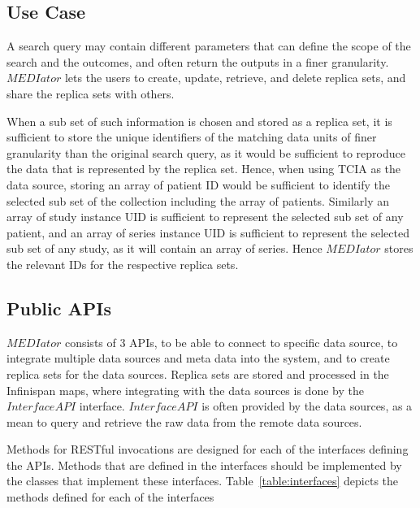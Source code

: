 \documentclass[conference]{IEEEtran}
\begin{document}
\subsection{Use Case}
A search query may contain different parameters that can define the scope of the search and the outcomes, and often return the outputs in a finer granularity. $MEDIator$ lets the users to create, update, retrieve, and delete replica sets, and share the replica sets with others.

When a sub set of such information is chosen and stored as a replica set, it is sufficient to store the unique identifiers of the matching data units of finer granularity than the original search query, as it would be sufficient to reproduce the data that is represented by the replica set. Hence, when using TCIA as the data source, storing an array of patient ID would be sufficient to identify the selected sub set of the collection including the array of patients. Similarly an array of study instance UID is sufficient to represent the selected sub set of any patient, and an array of series instance UID is sufficient to represent the selected sub set of any study, as it will contain an array of series. Hence $MEDIator$ stores the relevant IDs for the respective replica sets.

\subsection{Public APIs}
$MEDIator$ consists of 3 APIs, to be able to connect to specific data source, to integrate multiple data sources and meta data into the system, and to create replica sets for the data sources. Replica sets are stored and processed in the Infinispan maps, where integrating with the data sources is done by the $InterfaceAPI$ interface. $InterfaceAPI$ is often provided by the data sources, as a mean to query and retrieve the raw data from the remote data sources.

Methods for RESTful invocations are designed for each of the interfaces defining the APIs. Methods that are defined in the interfaces should be implemented by the classes that implement these interfaces. Table~\ref{table:interfaces} depicts the methods defined for each of the interfaces
\end{document}
